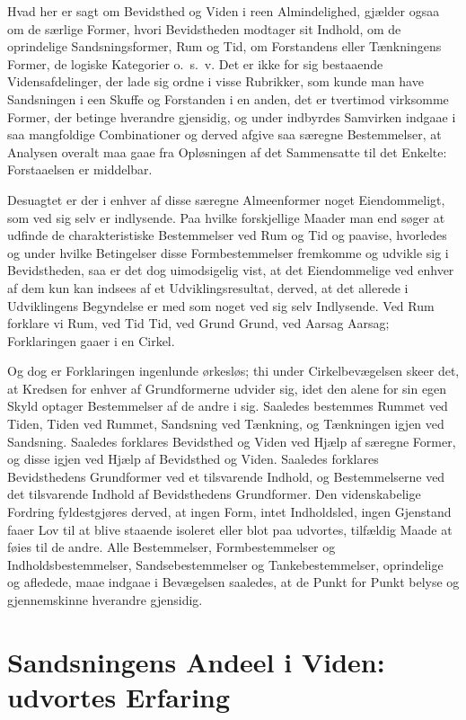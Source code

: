 \documentclass[12pt]{book}
\newcommand{\apage}[1]{\marginnote{\footnotesize\textit{[#1]}}}
\begin{document}
Hvad her er sagt om Bevidsthed og Viden i reen Almindelighed, gjælder
ogsaa om de særlige Former, hvori Bevidstheden modtager sit Indhold, om
de oprindelige Sandsningsformer, Rum og Tid, om Forstandens eller
Tænkningens Former, de logiske Kategorier o.\ s.\ v. Det er ikke for sig
bestaaende Vidensafdelinger, der lade sig ordne i visse Rubrikker, som
kunde man have Sandsningen i een Skuffe og Forstanden i en anden, det er
tvertimod virksomme Former, der betinge hverandre gjensidig, og under
indbyrdes Samvirken indgaae i saa mangfoldige Combinationer og derved
afgive saa særegne Bestemmelser, at Analysen overalt maa gaae fra
Opløsningen af det Sammensatte til det Enkelte: Forstaaelsen er
middelbar.

Desuagtet er der i enhver af disse særegne Almeenformer noget
Eiendommeligt, som ved sig selv er indlysende. Paa hvilke forskjellige
Maader man end søger at udfinde de charakteristiske Bestemmelser ved Rum
og Tid og paavise, hvorledes og under hvilke Betingelser disse
Formbestemmelser fremkomme og udvikle sig i Bevidstheden, saa er det dog
uimodsigelig vist, at det Eiendommelige ved enhver af dem kun kan indsees
af et Udviklingsresultat, derved, at det allerede i Udviklingens
Begyndelse er med som noget ved sig selv Indlysende. Ved Rum forklare vi
Rum, ved Tid Tid, ved Grund Grund, ved Aarsag Aarsag; Forklaringen gaaer
i en Cirkel.

\apage{9} Og dog er Forklaringen ingenlunde ørkesløs; thi under Cirkelbevægelsen
skeer det, at Kredsen for enhver af Grundformerne udvider sig, idet den
alene for sin egen Skyld optager Bestemmelser af de andre i sig. Saaledes
bestemmes Rummet ved Tiden, Tiden ved Rummet, Sandsning ved Tænkning, og
Tænkningen igjen ved Sandsning. Saaledes forklares Bevidsthed og Viden
ved Hjælp af særegne Former, og disse igjen ved Hjælp af Bevidsthed og
Viden. Saaledes forklares Bevidsthedens Grundformer ved et tilsvarende
Indhold, og Bestemmelserne ved det tilsvarende Indhold af Bevidsthedens
Grundformer. Den videnskabelige Fordring fyldestgjøres derved, at ingen
Form, intet Indholdsled, ingen Gjenstand faaer Lov til at blive staaende
isoleret eller blot paa udvortes, tilfældig Maade at føies til de andre.
Alle Bestemmelser, Formbestemmelser og Indholdsbestemmelser,
Sandsebestemmelser og Tankebestemmelser, oprindelige og afledede, maae
indgaae i Bevægelsen saaledes, at de Punkt for Punkt belyse og
gjennemskinne hverandre gjensidig.

\section{Sandsningens Andeel i Viden: udvortes Erfaring}
\label{sec:2}
\end{document}
